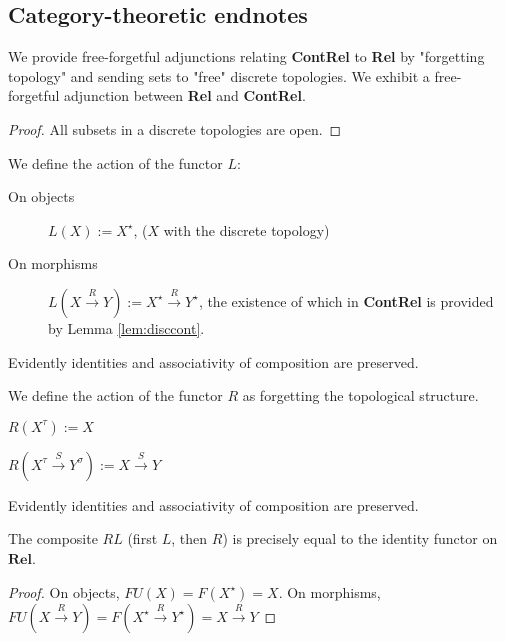 {\subsection{Category-theoretic endnotes}


We provide free-forgetful adjunctions relating \textbf{ContRel} to \textbf{Rel} by "forgetting topology" and sending sets to "free" discrete topologies. We exhibit a free-forgetful adjunction between \textbf{Rel} and \textbf{ContRel}.

\begin{lemma}\label{lem:disccont}
\begin{proof}
All subsets in a discrete topologies are open.
\end{proof}
\end{lemma}

\begin{defn} We define the action of the functor $L$:
\begin{description}
\item[On objects] $L(X) := X^\star$, ($X$ with the discrete topology)
\item[On morphisms] $L(X \overset{R}{\rightarrow} Y) := X^\star \overset{R}{\rightarrow} Y^\star$, the existence of which in \textbf{ContRel} is provided by Lemma \ref{lem:disccont}.
\end{description}
Evidently identities and associativity of composition are preserved.
\end{defn}

\begin{defn}
\begin{description} We define the action of the functor $R$ as forgetting the topological structure.
\item[On objects] $R(X^\tau) := X$
\item[On morphisms] $R(X^\tau \overset{S}{\rightarrow} Y^\sigma) := X \overset{S}{\rightarrow} Y$
\end{description}
Evidently identities and associativity of composition are preserved.
\end{defn}

\begin{lemma}[$RL = 1_{\textbf{Rel}}$]\label{lem:idadj}
The composite $RL$ (first $L$, then $R$) is precisely equal to the identity functor on $\mathbf{Rel}$.
\begin{proof}
On objects, $FU(X) = F(X^\star) = X$. On morphisms, $FU(X \overset{R}{\rightarrow} Y) = F(X^\star \overset{R}{\rightarrow} Y^\star) = X \overset{R}{\rightarrow} Y$
\end{proof}
\end{lemma}

}
